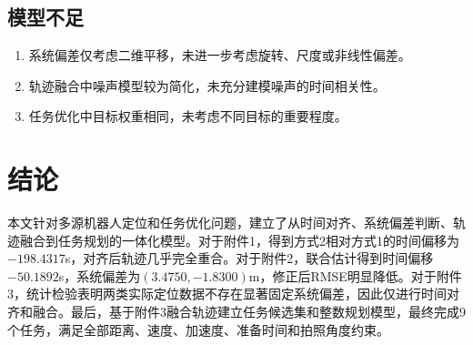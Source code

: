 \documentclass[UTF8,a4paper,12pt]{ctexart}
\begin{document}
\subsection{模型不足}
\begin{enumerate}
    \item 系统偏差仅考虑二维平移，未进一步考虑旋转、尺度或非线性偏差。
    \item 轨迹融合中噪声模型较为简化，未充分建模噪声的时间相关性。
    \item 任务优化中目标权重相同，未考虑不同目标的重要程度。
\end{enumerate}

\section{结论}
本文针对多源机器人定位和任务优化问题，建立了从时间对齐、系统偏差判断、轨迹融合到任务规划的一体化模型。对于附件1，得到方式2相对方式1的时间偏移为$-198.4317$s，对齐后轨迹几乎完全重合。对于附件2，联合估计得到时间偏移$-50.1892$s，系统偏差为$(3.4750,-1.8300)$m，修正后RMSE明显降低。对于附件3，统计检验表明两类实际定位数据不存在显著固定系统偏差，因此仅进行时间对齐和融合。最后，基于附件3融合轨迹建立任务候选集和整数规划模型，最终完成9个任务，满足全部距离、速度、加速度、准备时间和拍照角度约束。
\end{document}
